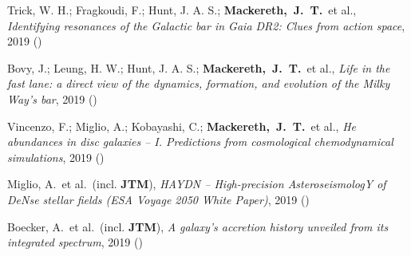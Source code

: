 \item[{\scriptsize5}]Trick, W. H.; Fragkoudi, F.; Hunt, J. A. S.; \textbf{Mackereth,~J.~T.}~et al., \textit{Identifying resonances of the Galactic bar in Gaia DR2: Clues from action space}, 2019 ()

\item[{\scriptsize4}]Bovy, J.; Leung, H. W.; Hunt, J. A. S.; \textbf{Mackereth,~J.~T.}~et al., \textit{Life in the fast lane: a direct view of the dynamics, formation, and evolution of the Milky Way's bar}, 2019 ()

\item[{\scriptsize3}]Vincenzo, F.; Miglio, A.; Kobayashi, C.; \textbf{Mackereth,~J.~T.}~et al., \textit{He abundances in disc galaxies -- I. Predictions from cosmological chemodynamical simulations}, 2019 ()

\item[{\scriptsize2}]Miglio, A.~et al.~(incl. \textbf{JTM}), \textit{HAYDN -- High-precision AsteroseismologY of DeNse stellar fields (ESA Voyage 2050 White Paper)}, 2019 ()

\item[{\scriptsize1}]Boecker, A.~et al.~(incl. \textbf{JTM}), \textit{A galaxy's accretion history unveiled from its integrated spectrum}, 2019 ()
